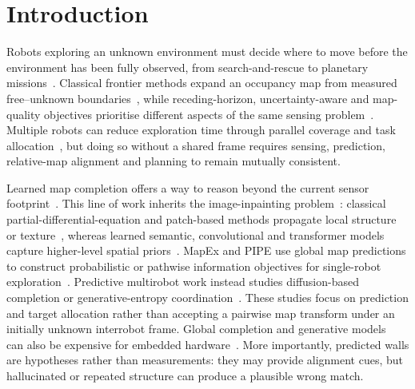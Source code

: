 \documentclass[11pt]{article}
\begin{document}

\section{Introduction} \label{sec::intro}

Robots exploring an unknown environment must decide where to move before the environment has been fully observed, from search-and-rescue to planetary missions~\citep{davids2002urban,vogele2024robotics}. Classical frontier methods expand an occupancy map from measured free--unknown boundaries~\citep{yamauchi1997frontier,scherer2022resilient,umari2017autonomous}, while receding-horizon, uncertainty-aware and map-quality objectives prioritise different aspects of the same sensing problem~\citep{bircher2016receding,vallve2014dense,lehner2017exploration}. Multiple robots can reduce exploration time through parallel coverage and task allocation~\citep{matos2024efficient,long2018towards,dias2006market,yu2016optimal,gautam2012review,farinelli2004multirobot}, but doing so without a shared frame requires sensing, prediction, relative-map alignment and planning to remain mutually consistent.

Learned map completion offers a way to reason beyond the current sensor footprint~\citep{stolzle2022reconstructing,triest2024unrealnet,shrestha2019learned,georgakis2022uncertainty,ramakrishnan2020occupancy,sharma2024pre,katyal2019uncertainty,gao2025mapping}. This line of work inherits the image-inpainting problem~\citep{bertalmio2000image}: classical partial-differential-equation and patch-based methods propagate local structure or texture~\citep{bertalmio2003simultaneous,tschumperle2005vector,efros1999texture,barnes2009patchmatch}, whereas learned semantic, convolutional and transformer models capture higher-level spatial priors~\citep{song2018spg,pathak2016context,liu2018image,yan2018shift,hosen2022masked,dong2022cswin,shamsolmoali2023transinpaint}. MapEx and PIPE use global map predictions to construct probabilistic or pathwise information objectives for single-robot exploration~\citep{ho2024mapex,baek2025pipe}. Predictive multirobot work instead studies diffusion-based completion or generative-entropy coordination~\citep{tan20244cnet,spinos2025map}. These studies focus on prediction and target allocation rather than accepting a pairwise map transform under an initially unknown interrobot frame. Global completion and generative models~\citep{goodfellow2014generative} can also be expensive for embedded hardware~\citep{kamath2023deep,goyal2004lightweight,que2026motimem}. More importantly, predicted walls are hypotheses rather than measurements: they may provide alignment cues, but hallucinated or repeated structure can produce a plausible wrong match.
\end{document}
